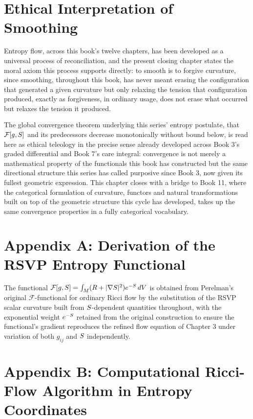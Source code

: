 \chapter{Ethical Interpretation of Smoothing}

Entropy flow, across this book's twelve chapters, has been developed as a universal process of reconciliation, and the present closing chapter states the moral axiom this process supports directly: to smooth is to forgive curvature, since smoothing, throughout this book, has never meant erasing the configuration that generated a given curvature but only relaxing the tension that configuration produced, exactly as forgiveness, in ordinary usage, does not erase what occurred but relaxes the tension it produced.

The global convergence theorem underlying this series' entropy postulate, that $\mathcal{F}[g,S]$ and its predecessors decrease monotonically without bound below, is read here as ethical teleology in the precise sense already developed across Book 3's graded differential and Book 7's care integral: convergence is not merely a mathematical property of the functionals this book has constructed but the same directional structure this series has called purposive since Book 3, now given its fullest geometric expression. This chapter closes with a bridge to Book 11, where the categorical formulation of curvature, functors and natural transformations built on top of the geometric structure this cycle has developed, takes up the same convergence properties in a fully categorical vocabulary.

\chapter*{Appendix A: Derivation of the RSVP Entropy Functional}

The functional $\mathcal{F}[g,S] = \int_M (R + |\nabla S|^2) e^{-S}\, dV$ is obtained from Perelman's original $\mathcal{F}$-functional for ordinary Ricci flow by the substitution of the RSVP scalar curvature built from $S$-dependent quantities throughout, with the exponential weight $e^{-S}$ retained from the original construction to ensure the functional's gradient reproduces the refined flow equation of Chapter 3 under variation of both $g_{ij}$ and $S$ independently.

\chapter*{Appendix B: Computational Ricci-Flow Algorithm in Entropy Coordinates}


